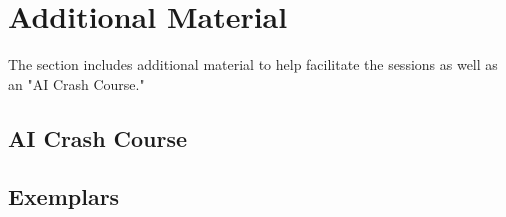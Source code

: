 \documentclass{article}
\begin{document}
\section*{\centering Additional Material}
%

The section includes additional material to help facilitate the sessions as well as an "AI Crash Course."
\vspace*{\fill}

\newpage
\subsection*{AI Crash Course}

%

\subsection*{Exemplars}
%
%
\end{document}
